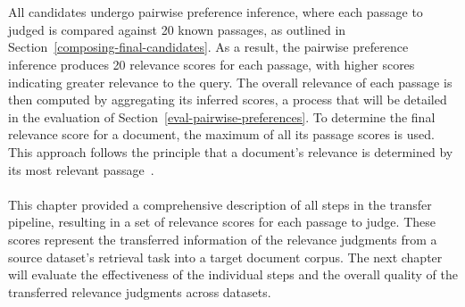 \\\\
All candidates undergo pairwise preference inference, where each passage to judged is compared against 20 known passages, as outlined in Section~\ref{composing-final-candidates}. As a result, the pairwise preference inference produces 20 relevance scores for each passage, with higher scores indicating greater relevance to the query. The overall relevance of each passage is then computed by aggregating its inferred scores, a process that will be detailed in the evaluation of Section~\ref{eval-pairwise-preferences}. To determine the final relevance score for a document, the maximum of all its passage scores is used. This approach follows the principle that a document's relevance is determined by its most relevant passage~\citep{craswell:2019}.
\\\\
This chapter provided a comprehensive description of all steps in the transfer pipeline, resulting in a set of relevance scores for each passage to judge. These scores represent the transferred information of the relevance judgments from a source dataset's retrieval task into a target document corpus. The next chapter will evaluate the effectiveness of the individual steps and the overall quality of the transferred relevance judgments across datasets.